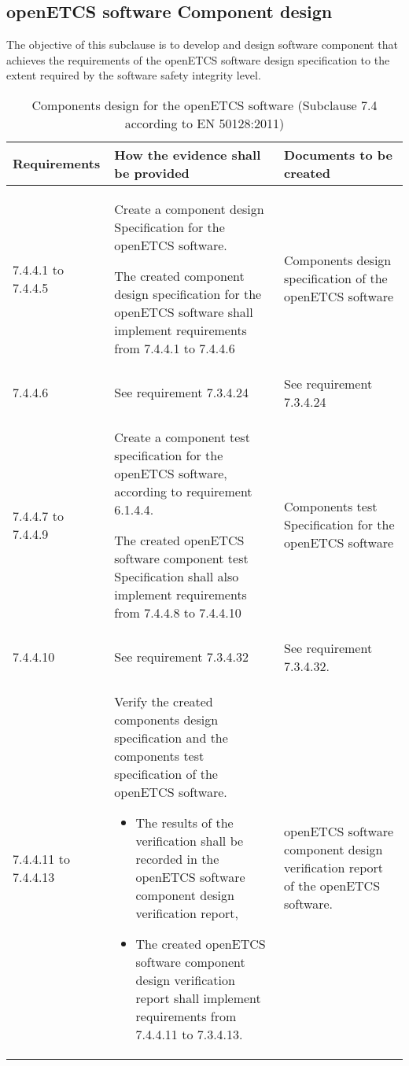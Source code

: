\documentclass{template/openetcs_report}
\begin{document}
\subsection{openETCS software Component design}
\begin{flushleft}
The objective of this subclause is to develop and design software component that achieves the requirements of the openETCS software design specification to the extent required by the software safety integrity level.
\end{flushleft}
{\footnotesize\sffamily\centering
\begin{longtable}{|p{2cm}|p{9cm}|p{3cm}|}
\caption{Components design for the openETCS software (Subclause 7.4 according to EN 50128:2011)}\\
\hline
\bfseries Requirements & \bfseries How the evidence shall be provided & \bfseries Documents to be created\\
\hline
\hline
\endhead
\hline
\endfoot

7.4.4.1 to 7.4.4.5 & Create a component design Specification for the openETCS software.
 
The created component design specification for the openETCS software shall implement requirements from 7.4.4.1 to 7.4.4.6
& Components design specification of the openETCS software\\ 
\hline
7.4.4.6 & See requirement 7.3.4.24 & See requirement 7.3.4.24\\ 
\hline
7.4.4.7 to 7.4.4.9 & Create a component test specification for the openETCS software, according to requirement 6.1.4.4.

The created openETCS software component test Specification shall also implement requirements from 7.4.4.8 to 7.4.4.10
& Components test Specification for the openETCS software\\ 
\hline
7.4.4.10 & See requirement 7.3.4.32 & See requirement 7.3.4.32.\\ 
\hline
7.4.4.11 to 7.4.4.13 & Verify the created components design specification and the components test specification of the openETCS software.
\begin{itemize}\itemsep=0pt
  \item The results of the verification shall be recorded in the openETCS software component design verification report,
  \item The created openETCS software component design verification report shall implement requirements from 7.4.4.11 to 7.3.4.13. 
\end{itemize}
& openETCS software component design verification report of the openETCS software.\\ 
\hline
\end{longtable}}
\end{document}
